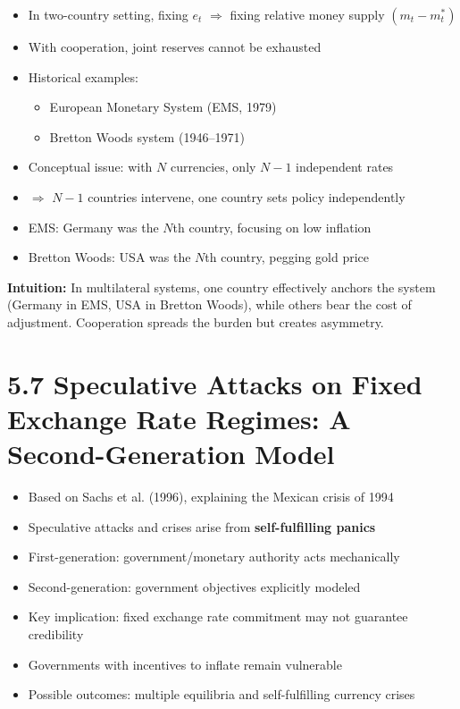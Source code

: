 \documentclass[12pt]{article}
\begin{document}
\begin{itemize}
    \item In two-country setting, fixing $e_t$ $\Rightarrow$ fixing relative money supply $(m_t - m_t^*)$
    \item With cooperation, joint reserves cannot be exhausted
    \item Historical examples:
        \begin{itemize}
            \item European Monetary System (EMS, 1979)
            \item Bretton Woods system (1946--1971)
        \end{itemize}
    \item Conceptual issue: with $N$ currencies, only $N-1$ independent rates
    \item $\Rightarrow$ $N-1$ countries intervene, one country sets policy independently
    \item EMS: Germany was the $N$th country, focusing on low inflation
    \item Bretton Woods: USA was the $N$th country, pegging gold price
\end{itemize}

\textbf{Intuition:} In multilateral systems, one country effectively anchors the system (Germany in EMS, USA in Bretton Woods), while others bear the cost of adjustment. Cooperation spreads the burden but creates asymmetry.

\section*{5.7 Speculative Attacks on Fixed Exchange Rate Regimes: A Second-Generation Model}

\begin{itemize}
    \item Based on Sachs et al. (1996), explaining the Mexican crisis of 1994
    \item Speculative attacks and crises arise from \textbf{self-fulfilling panics}
    \item First-generation: government/monetary authority acts mechanically
    \item Second-generation: government objectives explicitly modeled
    \item Key implication: fixed exchange rate commitment may not guarantee credibility 
    \item Governments with incentives to inflate remain vulnerable
    \item Possible outcomes: multiple equilibria and self-fulfilling currency crises
\end{itemize}
\end{document}
